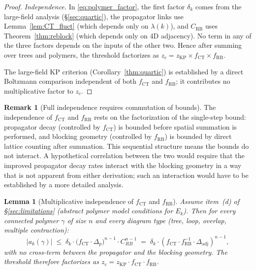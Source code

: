 \documentclass[11pt,a4paper]{amsart}
\newtheorem{lemma}[theorem]{Lemma}
\theoremstyle{definition}
\newtheorem{remark}[theorem]{Remark}
\newcommand{\zKP}{z_{\mathrm{KP}}}
\newcommand{\CRB}{C_{\mathrm{RB}}}
\begin{document}
\begin{proof}
\textit{Independence.}
In \eqref{eq:polymer_factor}, the first factor $\delta_k$ comes from the
large-field analysis (§\ref{sec:quartic}), the propagator links use
Lemma~\ref{lem:CT_fluct} (which depends only on $\lambda(k)$), and
$\CRB$ uses Theorem~\ref{thm:reblock} (which depends only on 4D adjacency).
No term in any of the three factors depends on the inputs of the other two.
Hence after summing over trees and polymers, the threshold factorizes as
$z_c = \zKP \times f_{\mathrm{CT}} \times f_{\mathrm{RB}}$.

The large-field KP criterion (Corollary~\ref{thm:quartic}) is established
by a direct Boltzmann comparison independent of both $f_{\mathrm{CT}}$ and
$f_{\mathrm{RB}}$; it contributes no multiplicative factor to $z_c$.
\end{proof}

\begin{remark}[Full independence requires commutation of bounds]
\label{rem:independence}
The independence of $f_{\mathrm{CT}}$ and $f_{\mathrm{RB}}$ rests on the
factorization of the single-step bound:
propagator decay (controlled by $f_{\mathrm{CT}}$) is bounded before
spatial summation is performed, and blocking geometry (controlled by
$f_{\mathrm{RB}}$) is bounded by direct lattice counting after summation.
This sequential structure means the bounds do not interact.  A hypothetical
correlation between the two would require that the improved propagator
decay rates interact with the blocking geometry in a way that is not
apparent from either derivation; such an interaction would have to be
established by a more detailed analysis.
\end{remark}

\begin{lemma}[Multiplicative independence of $f_{\mathrm{CT}}$ and $f_{\mathrm{RB}}$]
\label{lem:factor_independence}
Assume item~\textup{(d)} of \S\ref{sec:limitations} \textup{(}abstract polymer model
conditions for $E_k$\textup{)}.  Then for every connected polymer $\gamma$ of size $n$
and every diagram type \textup{(}tree, loop, overlap, multiple contraction\textup{)}:
\begin{equation}
\label{eq:factor_indep}
  |a_k(\gamma)|
  \;\le\; \delta_k
          \cdot \bigl(f_{\mathrm{CT}}\cdot\Delta_p\bigr)^{n-1}
          \cdot C_{RB}^{n-1}
  \;=\; \delta_k \cdot (f_{\mathrm{CT}} \cdot f_{\mathrm{RB}}^{-1}\cdot \Delta_{\mathrm{adj}})^{n-1},
\end{equation}
with no cross-term between the propagator and the blocking geometry.
The threshold therefore factorizes as
$z_c = z_{\mathrm{KP}} \cdot f_{\mathrm{CT}} \cdot f_{\mathrm{RB}}$.
\end{lemma}
\end{document}
